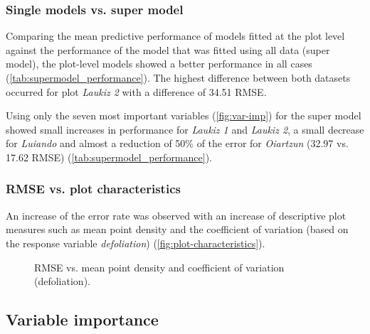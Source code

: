 \documentclass[review]{elsarticle}
\begin{document}
\subsubsection{Single models vs. super model}

\noindent Comparing the mean predictive performance of models fitted at the plot level against the performance of the model that was fitted using all data (super model), the plot-level models showed a better performance in all cases (\autoref{tab:supermodel_performance}).
The highest difference between both datasets occurred for plot \textit{Laukiz 2} with a difference of 34.51 RMSE.

Using only the seven most important variables (\autoref{fig:var-imp}) for the super model showed small increases in performance for \textit{Laukiz 1} and \textit{Laukiz 2}, a small decrease for \textit{Luiando} and almost a reduction of 50\% of the error for \textit{Oiartzun} (32.97 vs. 17.62 RMSE) (\autoref{tab:supermodel_performance}).

\subsubsection{RMSE vs. plot characteristics}

\noindent An increase of the error rate was observed with an increase of descriptive plot measures such as mean point density and the coefficient of variation (based on the response variable \textit{defoliation}) (\autoref{fig:plot-characteristics}).

\begin{figure} [t!]
	\begin{center}
		\caption{RMSE vs. mean point density and coefficient of variation (defoliation).}
		\label{fig:plot-characteristics}
	\end{center}
\end{figure}

\subsection{Variable importance}
\end{document}
